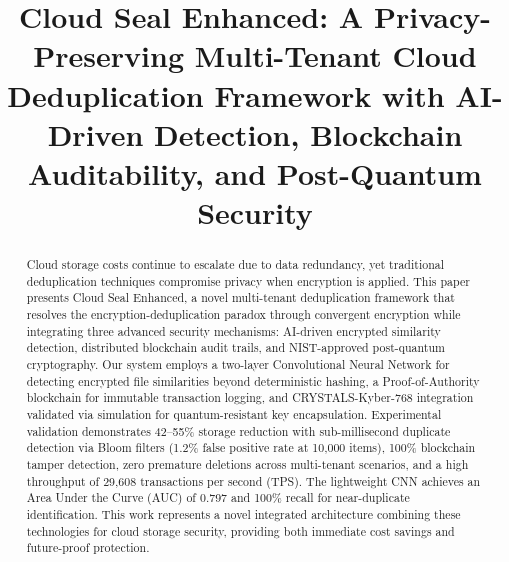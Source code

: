 \documentclass[conference]{IEEEtran}
\begin{document}
\title{Cloud Seal Enhanced: A Privacy-Preserving Multi-Tenant Cloud Deduplication Framework with AI-Driven Detection, Blockchain Auditability, and Post-Quantum Security}

\author{
\and
{}
}

\maketitle

\begin{abstract}
Cloud storage costs continue to escalate due to data redundancy, yet traditional deduplication techniques compromise privacy when encryption is applied. This paper presents Cloud Seal Enhanced, a novel multi-tenant deduplication framework that resolves the encryption-deduplication paradox through convergent encryption while integrating three advanced security mechanisms: AI-driven encrypted similarity detection, distributed blockchain audit trails, and NIST-approved post-quantum cryptography. Our system employs a two-layer Convolutional Neural Network for detecting encrypted file similarities beyond deterministic hashing, a Proof-of-Authority blockchain for immutable transaction logging, and CRYSTALS-Kyber-768 integration validated via simulation for quantum-resistant key encapsulation. Experimental validation demonstrates 42--55\% storage reduction with sub-millisecond duplicate detection via Bloom filters (1.2\% false positive rate at 10,000 items), 100\% blockchain tamper detection, zero premature deletions across multi-tenant scenarios, and a high throughput of 29,608 transactions per second (TPS). The lightweight CNN achieves an Area Under the Curve (AUC) of 0.797 and 100\% recall for near-duplicate identification. This work represents a novel integrated architecture combining these technologies for cloud storage security, providing both immediate cost savings and future-proof protection.
\end{abstract}
\end{document}
